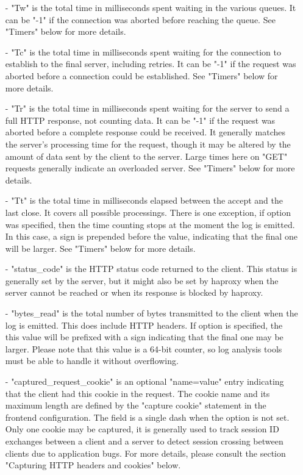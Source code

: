 \begin{itemize}
\item[-]
    "Tw" is the total time in milliseconds spent waiting in the various queues.
    It can be "-1" if the connection was aborted before reaching the queue.
    See "Timers" below for more details.

\item[-]
    "Tc" is the total time in milliseconds spent waiting for the connection to
    establish to the final server, including retries. It can be "-1" if the
    request was aborted before a connection could be established. See "Timers"
    below for more details.

\item[-]
    "Tr" is the total time in milliseconds spent waiting for the server to send
    a full HTTP response, not counting data. It can be "-1" if the request was
    aborted before a complete response could be received. It generally matches
    the server's processing time for the request, though it may be altered by
    the amount of data sent by the client to the server. Large times here on
    "GET" requests generally indicate an overloaded server. See "Timers" below
    for more details.

\item[-]
    "Tt" is the total time in milliseconds elapsed between the accept and the
    last close. It covers all possible processings. There is one exception, if
    option  was specified, then the time counting stops at the moment
    the log is emitted. In this case, a \chr{+} sign is prepended before the value,
    indicating that the final one will be larger. See "Timers" below for more
    details.

\item[-]
    "status\_code" is the HTTP status code returned to the client. This status
    is generally set by the server, but it might also be set by haproxy when
    the server cannot be reached or when its response is blocked by haproxy.

\item[-]
    "bytes\_read" is the total number of bytes transmitted to the client when
    the log is emitted. This does include HTTP headers. If option  is
    specified, the this value will be prefixed with a \chr{+} sign indicating that
    the final one may be larger. Please note that this value is a 64-bit
    counter, so log analysis tools must be able to handle it without
    overflowing.

\item[-]
    "captured\_request\_cookie" is an optional "name=value" entry indicating that
    the client had this cookie in the request. The cookie name and its maximum
    length are defined by the "capture cookie" statement in the frontend
    configuration. The field is a single dash \chr{-} when the option is not
    set. Only one cookie may be captured, it is generally used to track session
    ID exchanges between a client and a server to detect session crossing
    between clients due to application bugs. For more details, please consult
    the section "Capturing HTTP headers and cookies" below.


\end{itemize}
